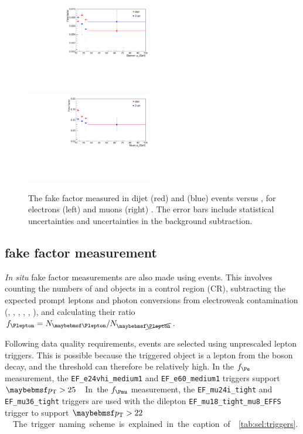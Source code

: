 \begin{figure}
	\includegraphics[width=0.495\textwidth]{custom_images/wjets/ff_el_data}
	\hfill
	\includegraphics[width=0.495\textwidth]{custom_images/wjets/ff_mu_data}
	\caption{The fake factor measured in dijet (red) and \Zjets (blue) events versus \pt, 
	for electrons (left) and muons (right) \cite{BackgroundNote}. The error bars include 
	statistical uncertainties and uncertainties in the background subtraction.}
	\label{fig:wjets:ff_data}
\end{figure}



\subsection{\Zjets fake factor measurement}
\label{sec:wjets:zjet_ff}

\textit{In situ} fake factor measurements are also made using \Zjets events. This 
involves counting the numbers of \id{\Plepton} and \antiid{\Plepton} objects in a \Zjets 
control region (CR), subtracting the expected prompt leptons and photon conversions from 
electroweak contamination (\Zgamma, \ZZ, \Zgstar, \Wgamma, \WZ, \Wgstar), and calculating 
their ratio $f_{\Plepton} = N_{\id{\Plepton}} / N_{\antiid{\Plepton}}$.

Following data quality requirements, events are selected using unprescaled lepton 
triggers. This is possible because the triggered object is a lepton from the \PZ boson 
decay, and the \pt threshold can therefore be relatively high. In the $f_{\Pe}$ 
measurement, the \verb|EF_e24vhi_medium1| and \verb|EF_e60_medium1| triggers support 
\unit{$\pt > 25$}{\GeV}. In the $f_{\Pmu}$ measurement, the \verb|EF_mu24i_tight| and 
\verb|EF_mu36_tight| triggers are used with the dilepton \verb|EF_mu18_tight_mu8_EFFS| 
trigger to support \unit{$\pt > 22$}{\GeV}. The trigger naming scheme is explained in the 
caption of \Table~\ref{tab:sel:triggers}.

